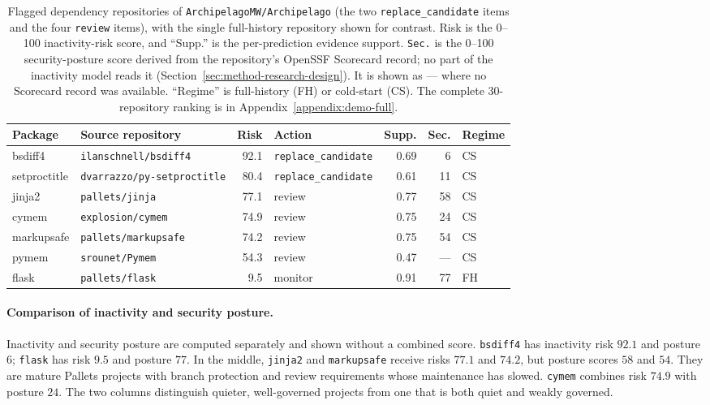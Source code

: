 \begin{table}[htbp]
  \centering
  \small
  \caption{Flagged dependency repositories of \texttt{ArchipelagoMW/Archipelago}
  (the two \texttt{replace\_candidate} items and the four \texttt{review} items),
  with the single full-history repository shown for contrast. Risk is the 0--100
  inactivity-risk score, and ``Supp.'' is the per-prediction evidence support.
  \texttt{Sec.} is the 0--100 security-posture score derived from the repository's
  OpenSSF Scorecard record; no part of the inactivity model reads it
  (Section~\ref{sec:method-research-design}). It is shown as --- where no Scorecard
  record was available. ``Regime'' is full-history (FH) or cold-start (CS). The
  complete 30-repository ranking is in Appendix~\ref{appendix:demo-full}.}
  \label{tab:demo-ranking}
  \setlength{\tabcolsep}{4pt}
  \begin{tabular}{llrlrrl}
    \toprule
    Package & Source repository & Risk & Action & Supp. & Sec. & Regime \\
    \midrule
    bsdiff4      & \texttt{ilanschnell/bsdiff4}       & 92.1 & \texttt{replace\_candidate} & 0.69 & 6 & CS \\
    setproctitle & \texttt{dvarrazzo/py-setproctitle} & 80.4 & \texttt{replace\_candidate} & 0.61 & 11 & CS \\
    \midrule
    jinja2       & \texttt{pallets/jinja}             & 77.1 & review  & 0.77 & 58 & CS \\
    cymem        & \texttt{explosion/cymem}           & 74.9 & review  & 0.75 & 24 & CS \\
    markupsafe   & \texttt{pallets/markupsafe}        & 74.2 & review  & 0.75 & 54 & CS \\
    pymem        & \texttt{srounet/Pymem}             & 54.3 & review  & 0.47 & --- & CS \\
    \midrule
    flask        & \texttt{pallets/flask}             &  9.5 & monitor & 0.91 & 77 & FH \\
    \bottomrule
  \end{tabular}
\end{table}

\paragraph{Comparison of inactivity and security posture.} Inactivity and security posture are
computed separately and shown without a combined score. \texttt{bsdiff4} has
inactivity risk \(92.1\) and posture \(6\); \texttt{flask} has risk \(9.5\) and
posture \(77\). In the middle, \texttt{jinja2} and \texttt{markupsafe} receive
risks \(77.1\) and \(74.2\), but posture scores \(58\) and \(54\). They are
mature Pallets projects with branch protection and review requirements whose
maintenance has slowed. \texttt{cymem} combines risk \(74.9\) with posture
\(24\). The two columns distinguish quieter, well-governed projects from one
that is both quiet and weakly governed.

